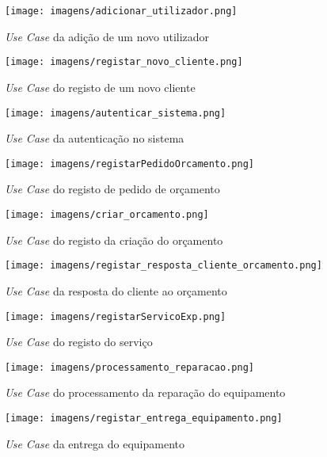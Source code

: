 \documentclass{article}
\begin{document}
\begin{figure}[H]
    \centering
    \texttt{[image: imagens/adicionar\_utilizador.png]}
    \caption{\textit{Use Case} da adição de um novo utilizador}
\end{figure}

\begin{figure}[H]
    \centering
    \texttt{[image: imagens/registar\_novo\_cliente.png]}
    \caption{\textit{Use Case} do registo de um novo cliente}
\end{figure}

\begin{figure}[H]
    \centering
    \texttt{[image: imagens/autenticar\_sistema.png]}
    \caption{\textit{Use Case} da autenticação no sistema}
\end{figure}

\begin{figure}[H]
    \centering
    \texttt{[image: imagens/registarPedidoOrcamento.png]}
    \caption{\textit{Use Case} do registo de pedido de orçamento}
\end{figure}

\begin{figure}[H]
    \centering
    \texttt{[image: imagens/criar\_orcamento.png]}
    \caption{\textit{Use Case} do registo da criação do orçamento}
\end{figure}

\begin{figure}[H]
    \centering
    \texttt{[image: imagens/registar\_resposta\_cliente\_orcamento.png]}
    \caption{\textit{Use Case} da resposta do cliente ao orçamento}
\end{figure}

\begin{figure}[H]
    \centering
    \texttt{[image: imagens/registarServicoExp.png]}
    \caption{\textit{Use Case} do registo do serviço}
\end{figure}

\begin{figure}[H]
    \centering
    \texttt{[image: imagens/processamento\_reparacao.png]}
    \caption{\textit{Use Case} do processamento da reparação do equipamento}
\end{figure}

\begin{figure}[H]
    \centering
    \texttt{[image: imagens/registar\_entrega\_equipamento.png]}
    \caption{\textit{Use Case} da entrega do equipamento}
\end{figure}
\end{document}
